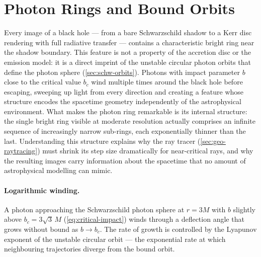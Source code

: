 \section{Photon Rings and Bound Orbits\starmark{}}
\label{sec:geo-photon-rings}

Every image of a black hole --- from a bare Schwarzschild shadow to a
Kerr disc rendering with full radiative transfer --- contains a
characteristic bright ring near the shadow boundary.  This feature is
not a property of the accretion disc or the emission model: it is a
direct imprint of the unstable circular photon orbits that define the
photon sphere (\cref{sec:schw-orbits}).  Photons with impact parameter
$b$ close to the critical value $b_c$ wind multiple times around the
black hole before escaping, sweeping up light from every direction and
creating a feature whose structure encodes the spacetime geometry
independently of the astrophysical environment.  What makes the photon
ring remarkable is its internal structure: the single bright ring
visible at moderate resolution actually comprises an infinite sequence
of increasingly narrow sub-rings, each exponentially thinner than the
last.  Understanding this structure explains why the ray tracer
(\cref{sec:geo-raytracing}) must shrink its step size dramatically for
near-critical rays, and why the resulting images carry information about
the spacetime that no amount of astrophysical modelling can mimic.

\paragraph{Logarithmic winding.}

A photon approaching the Schwarzschild photon sphere at $r = 3M$ with
$b$ slightly above $b_c = 3\sqrt{3}\,M$
(\cref{eq:critical-impact}) winds through a deflection angle that grows
without bound as $b \to b_c$.  The rate of growth is controlled by the
Lyapunov exponent of the unstable circular orbit --- the exponential
rate at which neighbouring trajectories diverge from the bound orbit.

